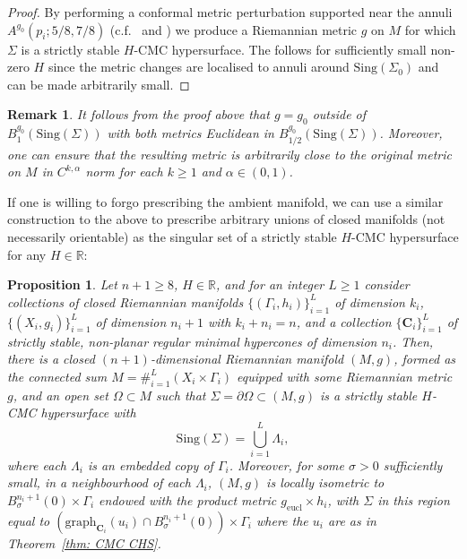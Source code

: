\documentclass[12pt]{article}
\newtheorem{proposition}{Proposition}
\newtheorem{remark}{Remark}
\begin{document}
\begin{proof}
    \bigskip
    
    By performing a conformal metric perturbation supported near the annuli $A^{g_0}(p_i;5/8,7/8)$ (c.f.~\cite[Proposition 1]{BM25} and \cite[Proposition 2.1]{M24}) we produce a Riemannian metric $g$ on $M$ for which $\Sigma$ is a strictly stable $H$-CMC hypersurface. The follows for sufficiently small non-zero $H$ since the metric changes are localised to annuli around $\mathrm{Sing}(\Sigma_0)$ and can be made arbitrarily small.
\end{proof}


\begin{remark}\label{rem: close gluing metrics}
    It follows from the proof above that $g = g_0$ outside of $B_1^{g_0}(\mathrm{Sing}(\Sigma))$ with both metrics Euclidean in $B_{1/2}^{g_0}(\mathrm{Sing}(\Sigma))$. Moreover, one can ensure that the resulting metric is arbitrarily close to the original metric on $M$ in $C^{k,\alpha}$ norm for each $k \geq 1$ and $\alpha \in (0,1)$.
\end{remark}

If one is willing to forgo prescribing the ambient manifold, we can use a similar construction to the above to prescribe arbitrary unions of closed manifolds (not necessarily orientable) as the singular set of a strictly stable $H$-CMC hypersurface for any $H \in \mathbb{R}$:

\begin{proposition}\label{prop: construction with arbitrary singular set}
    Let $n + 1 \geq 8$, $H \in \mathbb{R}$, and for an integer $L \geq 1$ consider collections of closed Riemannian manifolds $\{(\Gamma_i,h_i)\}_{i = 1}^L$ of dimension $k_i$, $\{(X_i,g_i)\}_{i = 1}^L$ of dimension $n_i + 1$ with $k_i + n_i = n$, and a collection $\{\mathbf{C}_i\}_{i = 1}^L$ of strictly stable, non-planar regular minimal hypercones of dimension $n_i$. Then, there is a closed $(n+1)$-dimensional Riemannian manifold $(M,g)$, formed as the connected sum $M = \#_{i = 1}^L(X_i \times \Gamma_i)$ equipped with some Riemannian metric $g$, and an open set $\Omega \subset M$ such that $\Sigma = \partial \Omega \subset (M,g)$ is a strictly stable $H$-CMC hypersurface with
    $$\mathrm{Sing}(\Sigma) = \bigcup_{i = 1}^L \Lambda_i,$$
    where each $\Lambda_i$ is an embedded copy of $\Gamma_i$. Moreover, for some $\sigma > 0$ sufficiently small, in a neighbourhood of each $\Lambda_i$, $(M,g)$ is locally isometric to $B^{n_i+1}_\sigma(0)\times \Gamma_i$ endowed with the product metric $g_{\mathrm{eucl}}\times h_i$, 
    with $\Sigma$ in this region equal to $(\mathrm{graph}_{\mathbf{C}_i}(u_i) \cap B^{n_i+1}_\sigma(0))\times \Gamma_i$ where the $u_i$ are as in Theorem~\ref{thm: CMC CHS}.
\end{proposition}
\end{document}

